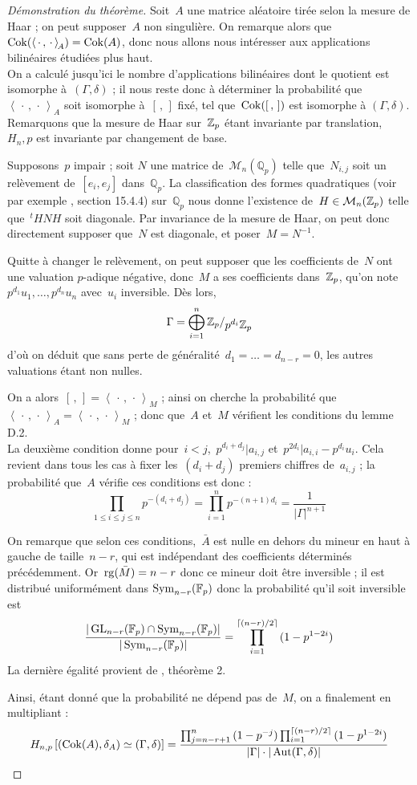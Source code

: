 \begin{proof}[Démonstration du théorème]
Soit~$A$ une matrice aléatoire tirée selon la mesure de Haar ; on peut supposer~$A$ non singulière. On remarque alors que~$\operatorname{Cok}(\left<\,\cdot\,,\,\cdot\,\right>_{\!A}) = \operatorname{Cok}(A)$, donc nous allons nous intéresser aux applications bilinéaires étudiées plus haut.\\
On a calculé jusqu'ici le nombre d'applications bilinéaires dont le quotient est isomorphe à~$(\Gamma, \delta)$ ; il nous reste donc à déterminer la probabilité que $\left<\,\cdot\,,\,\cdot\,\right>_{\!A}$ soit isomorphe à~$[\,,\,]$ fixé, tel que~$\operatorname{Cok}([\,,\,])$ est isomorphe à $(\Gamma,\delta)$. Remarquons que la mesure de Haar sur~$\mathbb{Z}_p$ étant invariante par translation,~$H_n,p$ est invariante par changement de base.

Supposons~$p$ impair ; soit $N$ une matrice de~$\mathcal{M}_n(\mathbb Q_p)$ telle que~$N_{i,j}$ soit un relèvement de~$[e_i, e_j]$ dans~$\mathbb Q_p$. La classification des formes quadratiques (voir par exemple \cite{quad}, section 15.4.4) sur~$\mathbb{Q}_p$ nous donne l'existence de~$H\in\mathcal M_n(\mathbb{Z}_p)$ telle que~${}^tHNH$ soit diagonale. Par invariance de la mesure de Haar, on peut donc directement supposer que~$N$ est diagonale, et poser~$M = N^{-1}$.

Quitte à changer le relèvement, on peut supposer que les coefficients de~$N$ ont une valuation $p$-adique négative, donc~$M$ a ses coefficients dans~$\mathbb{Z}_p$, qu'on note~$p^{d_1}u_1, \dots, p^{d_n}u_n$ avec~$u_i$ inversible. Dès lors,
\[ \Gamma = \bigoplus_{i=1}^{n}\quotient{\Zp}{p^{d_i}\Zp} \]
d'où on déduit que sans perte de généralité~$d_1=\dots=d_{n-r}=0$, les autres valuations étant non nulles.

On a alors~$[\,,\,] = \left<\,\cdot\,,\,\cdot\,\right>_{\!M}$ ; ainsi on cherche la probabilité que~$\left<\,\cdot\,,\,\cdot\,\right>_{\!A}=\left<\,\cdot\,,\,\cdot\,\right>_{\!M}$ ; donc que~$A$ et~$M$ vérifient les conditions du lemme D.2.\\
La deuxième condition donne pour~$i<j$,~$p^{d_i+d_j} | a_{i,j}$ et~$p^{2d_i} | a_{i,i}-p^{d_i}u_i$. Cela revient dans tous les cas à fixer les~$(d_i+d_j)$ premiers chiffres de~$a_{i,j}$ ; la probabilité que~$A$ vérifie ces conditions est donc :
\[ \prod_{1\leq i\leq j\leq n}p^{-(d_i+d_j)} = \prod_{i=1}^{n}p^{-(n+1)d_i} = \frac1{|\Gamma|^{n+1}}\]

On remarque que selon ces conditions,~$\bar A$ est nulle en dehors du mineur en haut à gauche de taille~$n-r$, qui est indépendant des coefficients déterminés précédemment. Or~$\operatorname{rg}(\bar M) = n-r$ donc ce mineur doit être inversible ; il est distribué uniformément dans $\operatorname{Sym}_{n-r}(\mathbb F_p)$ donc la probabilité qu'il soit inversible est
\[ \frac{|\operatorname{GL}_{n-r}(\mathbb F_p)\cap \operatorname{Sym}_{n-r}(\mathbb F_p)|}{|\operatorname{Sym}_{n-r}(\mathbb F_p)|}= \prod_{i=1}^{\lceil (n-r)/2\rceil}{(1-p^{1-2i})} \]
La dernière égalité provient de \cite{sym}, théorème 2.

Ainsi, étant donné que la probabilité ne dépend pas de~$M$, on a finalement en multipliant :
\[ H_{n,p}\left[(\operatorname{Cok}(A),\delta_A) \simeq (\Gamma,\delta)\right] = \frac{\prod_{j=n-r+1}^{n}{(1-p^{-j})}\prod_{i=1}^{\lceil (n-r)/2\rceil}{(1-p^{1-2i})}}{|\Gamma|\cdot|\operatorname{Aut}(\Gamma,\delta)|} \]
\end{proof}
